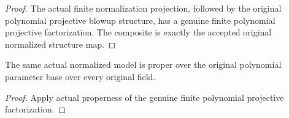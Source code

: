 \begin{proof}The actual finite normalization projection, followed by the original polynomial projective blowup structure, has a genuine finite polynomial projective factorization. The composite is exactly the accepted original normalized structure map.\end{proof}
\begin{lemma}\label{lem:pl-normalized-proper-any-field}
The same actual normalized model is proper over the original polynomial parameter base over every original field.
\leanok
\end{lemma}
\begin{proof}Apply actual properness of the genuine finite polynomial projective factorization.\end{proof}
